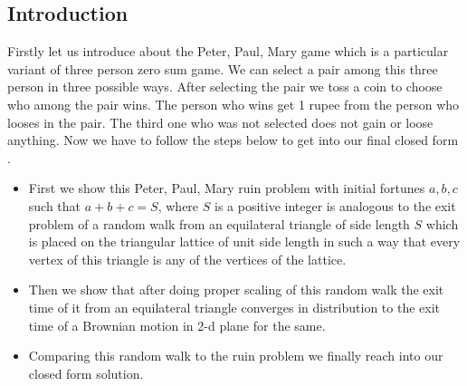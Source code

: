 \documentclass[a0,portrait]{a0poster}
\begin{document}
\begin{mdframed}[style=MyFrame]
\begin{multicols}{2}
\section{Introduction}\label{section:1}
Firstly let us introduce about the Peter, Paul, Mary game which is a particular variant of three person zero sum game. We can select a pair among this three person in three possible ways. After selecting the pair we toss a coin to choose who among the pair wins. The person who wins get 1 rupee from the person who looses in the pair. The third one who was not selected does not gain or loose anything. Now we have to follow the steps below to get into our final closed form \cite[p. 44]{MR2023644}.
\begin{itemize}
   \item First we show this Peter, Paul, Mary ruin problem with initial fortunes $a,b,c$ such that $a+b+c=S$, where $S$ is a positive integer is analogous to the exit problem of a random walk from an equilateral triangle of side length $S$ which is placed on the triangular lattice of unit side length in such a way that every vertex of this triangle is any of the vertices of the lattice.
   \item Then we show that after doing proper scaling of this random walk the exit time of it from an equilateral triangle converges in distribution to the exit time of a Brownian motion in 2-d plane for the same.
   \item Comparing this random walk to the ruin problem we finally reach into our closed form solution.
\end{itemize}

%




\end{multicols}
\end{mdframed}
\end{document}
